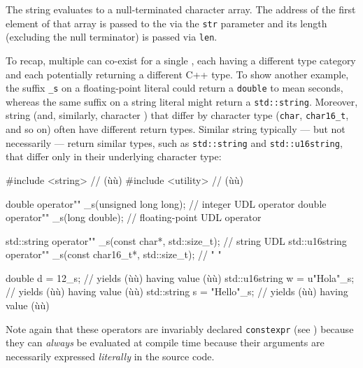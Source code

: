 \noindent The string  evaluates to a null-terminated
character array. The address of the first element of that array is
passed to the  via the \lstinline!str! parameter and
its length (excluding the null terminator) is passed via \lstinline!len!.

To recap, multiple  can co-exist
for a single , each having a different type category
and each potentially returning a different C++ type. To show another
example, the suffix \lstinline!_s! on a floating-point literal could
return a \lstinline!double! to mean seconds, whereas the same suffix on a
string literal might return a \lstinline!std::string!. Moreover, string
 (and, similarly, character ) that differ by character type (\lstinline!char!,
\lstinline!char16_t!, and so on) often have different return types.
Similar string  typically --- but not necessarily
--- return similar types, such as \lstinline!std::string! and
\lstinline!std::u16string!, that differ only in their underlying character
type:

\begin{emcppslisting}
#include <string>   // (ù{}ù)
#include <utility>  // (ù{}ù)

double operator"" _s(unsigned long long);  // integer UDL operator
double operator"" _s(long double);         // floating-point UDL operator

std::string    operator"" _s(const char*,     std::size_t);  // string UDL
std::u16string operator"" _s(const char16_t*, std::size_t);  //   "     "

double         d = 12_s;       // yields (ù{}ù) having value (ù{}ù)
std::u16string w = u"Hola"_s;  // yields (ù{}ù) having value (ù{}ù)
std::string    s = "Hello"_s;  // yields (ù{}ù) having value (ù{}ù)
\end{emcppslisting}
    
\noindent Note again that these operators are invariably declared
\lstinline!constexpr! (see )
because they can \emph{always} be evaluated at compile time because
their arguments are necessarily expressed \emph{literally} in the source
code.

